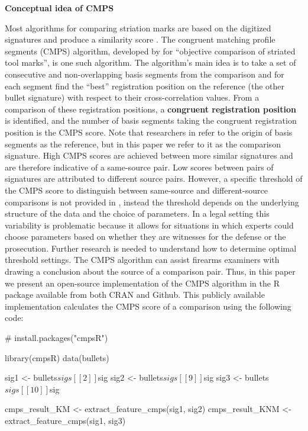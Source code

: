 \textbf{Conceptual idea of CMPS}

Most algorithms for comparing striation marks are based on the digitized
signatures and produce a similarity score
\citep[\citet{ChumbleyL_Scott2010VoTM}, \citet{aoas},
\citet{pmid30444940}]{song2005}. The congruent matching profile segments
(CMPS) algorithm, developed by \citet{cmps} for ``objective comparison
of striated tool marks'', is one such algorithm. The algorithm's main
idea is to take a set of consecutive and non-overlapping basis segments
from the comparison and for each segment find the ``best'' registration
position on the reference (the other bullet signature) with respect to
their cross-correlation values. From a comparison of these registration
positions, a \textbf{congruent registration position} is identified, and
the number of basis segments taking the congruent registration position
is the CMPS score. Note that researchers in \citet{cmps} refer to the
origin of basis segments as the reference, but in this paper we refer to
it as the comparison signature. High CMPS scores are achieved between
more similar signatures and are therefore indicative of a same-source
pair. Low scores between pairs of signatures are attributed to different
source pairs. However, a specific threshold of the CMPS score to
distinguish between same-source and different-source comparisons is not
provided in \citet{cmps}, instead the threshold depends on the
underlying structure of the data and the choice of parameters. In a
legal setting this variability is problematic because it allows for
situations in which experts could choose parameters based on whether
they are witnesses for the defense or the prosecution. Further research
is needed to understand how to determine optimal threshold settings. The
CMPS algorithm can assist firearms examiners with drawing a conclusion
about the source of a comparison pair. Thus, in this paper we present an
open-source implementation of the CMPS algorithm in the R package
 available from both CRAN and Github. This publicly available
implementation calculates the CMPS score of a comparison using the
following code:

\begin{Schunk}
\begin{Sinput}
# install.packages("cmpsR")

library(cmpsR)
data(bullets)

sig1 <- bullets$sigs[[2]]$sig
sig2 <- bullets$sigs[[9]]$sig
sig3 <- bullets$sigs[[10]]$sig

cmps_result_KM <- extract_feature_cmps(sig1, sig2)
cmps_result_KNM <- extract_feature_cmps(sig1, sig3)
\end{Sinput}
\end{Schunk}


